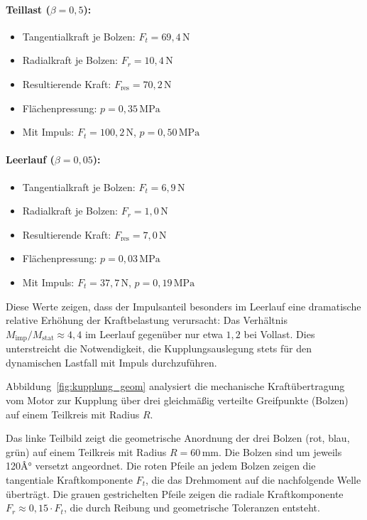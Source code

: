 ﻿\documentclass[a4paper,12pt]{article}
\begin{document}
\paragraph{Teillast ($\beta = 0{,}5$):}
\begin{itemize}
  \item Tangentialkraft je Bolzen: $F_t = 69{,}4\,\text{N}$
  \item Radialkraft je Bolzen: $F_r = 10{,}4\,\text{N}$
  \item Resultierende Kraft: $F_\text{res} = 70{,}2\,\text{N}$
  \item Flächenpressung: $p = 0{,}35\,\text{MPa}$
  \item Mit Impuls: $F_t = 100{,}2\,\text{N}$, $p = 0{,}50\,\text{MPa}$
\end{itemize}

\paragraph{Leerlauf ($\beta = 0{,}05$):}
\begin{itemize}
  \item Tangentialkraft je Bolzen: $F_t = 6{,}9\,\text{N}$
  \item Radialkraft je Bolzen: $F_r = 1{,}0\,\text{N}$
  \item Resultierende Kraft: $F_\text{res} = 7{,}0\,\text{N}$
  \item Flächenpressung: $p = 0{,}03\,\text{MPa}$
  \item Mit Impuls: $F_t = 37{,}7\,\text{N}$, $p = 0{,}19\,\text{MPa}$
\end{itemize}

Diese Werte zeigen, dass der Impulsanteil besonders im Leerlauf eine dramatische
relative Erhöhung der Kraftbelastung verursacht: Das Verhältnis
$M_\text{imp}/M_\text{stat} \approx 4{,}4$ im Leerlauf gegenüber nur etwa
$1{,}2$ bei Vollast. Dies unterstreicht die Notwendigkeit, die Kupplungsauslegung
stets für den dynamischen Lastfall mit Impuls durchzuführen.

Abbildung~\ref{fig:kupplung_geom} analysiert die mechanische Kraftübertragung
vom Motor zur Kupplung über drei gleichmäßig verteilte Greifpunkte (Bolzen)
auf einem Teilkreis mit Radius $R$.

Das linke Teilbild zeigt die geometrische Anordnung der drei Bolzen
(rot, blau, grün) auf einem Teilkreis mit Radius $R = 60\,\text{mm}$.
Die Bolzen sind um jeweils 120Â° versetzt angeordnet. Die roten Pfeile
an jedem Bolzen zeigen die tangentiale Kraftkomponente $F_t$, die das
Drehmoment auf die nachfolgende Welle überträgt. Die grauen gestrichelten
Pfeile zeigen die radiale Kraftkomponente $F_r \approx 0{,}15 \cdot F_t$,
die durch Reibung und geometrische Toleranzen entsteht.
\end{document}
